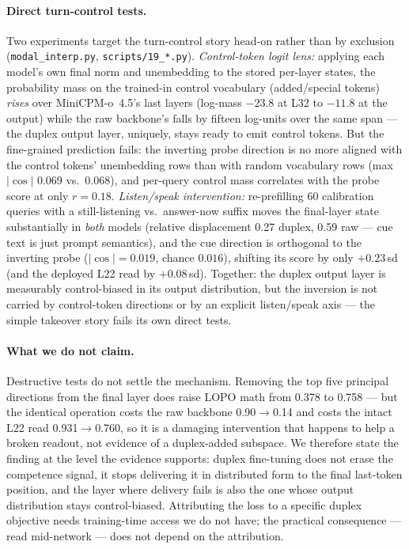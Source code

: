 \paragraph{Direct turn-control tests.} Two experiments target the
turn-control story head-on rather than by exclusion
(\texttt{modal\_interp.py}, \texttt{scripts/19\_*.py}). \emph{Control-token
logit lens:} applying each model's own final norm and unembedding to
the stored per-layer states, the probability mass on the trained-in
control vocabulary (added/special tokens) \emph{rises} over
MiniCPM-o~4.5's last layers (log-mass $-23.8$ at L32 to $-11.8$ at the
output) while the raw backbone's falls by fifteen log-units over the
same span --- the duplex output layer, uniquely, stays ready to emit
control tokens. But the fine-grained prediction fails: the inverting
probe direction is no more aligned with the control tokens' unembedding
rows than with random vocabulary rows (max $|\cos|$ 0.069 vs.\ 0.068),
and per-query control mass correlates with the probe score at only
$r{=}0.18$. \emph{Listen/speak intervention:} re-prefilling 60
calibration queries with a still-listening vs.\ answer-now suffix moves
the final-layer state substantially in \emph{both} models (relative
displacement 0.27 duplex, 0.59 raw --- cue text is just prompt
semantics), and the cue direction is orthogonal to the inverting probe
($|\cos|{=}0.019$, chance $0.016$), shifting its score by only
$+0.23$\,sd (and the deployed L22 read by $+0.08$\,sd). Together: the
duplex output layer is measurably control-biased in its output
distribution, but the inversion is not carried by control-token
directions or by an explicit listen/speak axis --- the simple
takeover story fails its own direct tests.

\paragraph{What we do not claim.} Destructive tests do not settle the
mechanism. Removing the top five principal directions from the final
layer does raise LOPO math from 0.378 to 0.758 --- but the identical
operation costs the raw backbone 0.90$\to$0.14 and costs the intact
L22 read 0.931$\to$0.760, so it is a damaging intervention that
happens to help a broken readout, not evidence of a duplex-added
subspace. We therefore state the finding at the level the evidence
supports: duplex fine-tuning does not erase the competence signal, it
stops delivering it in distributed form to the final last-token
position, and the layer where delivery fails is also the one whose
output distribution stays control-biased. Attributing the loss to a
specific duplex objective needs training-time access we do not have;
the practical consequence --- read mid-network --- does not depend on
the attribution.

